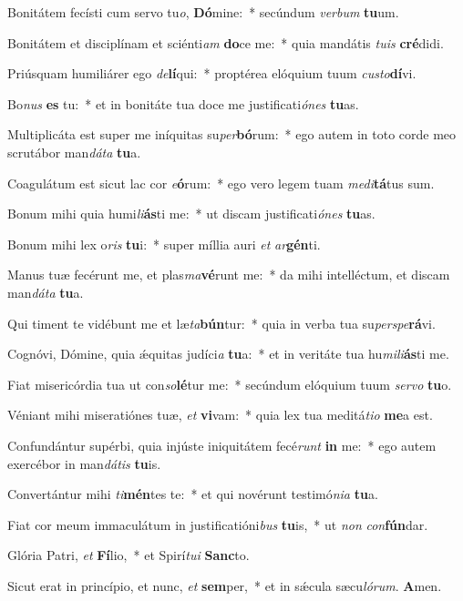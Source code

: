﻿\item Bonitátem fecísti cum servo tu\emph{o}, \textbf{Dó}mine:~* secúndum \emph{ver}\emph{bum} \textbf{tu}um.
\item Bonitátem et disciplínam et sciénti\emph{am} \textbf{do}ce me:~* quia mandátis \emph{tu}\emph{is} \textbf{cré}didi.
\item Priúsquam humiliárer ego \emph{de}\textbf{lí}qui:~* proptérea elóquium tuum \emph{cus}\emph{to}\textbf{dí}vi.
\item Bo\emph{nus} \textbf{es} tu:~* et in bonitáte tua doce me justificati\emph{ó}\emph{nes} \textbf{tu}as.
\item Multiplicáta est super me iníquitas su\emph{per}\textbf{bó}rum:~* ego autem in toto corde meo scrutábor man\emph{dá}\emph{ta} \textbf{tu}a.
\item Coagulátum est sicut lac cor \emph{e}\textbf{ó}rum:~* ego vero legem tuam \emph{me}\emph{di}\textbf{tá}tus sum.
\item Bonum mihi quia humi\emph{li}\textbf{ás}ti me:~* ut discam justificati\emph{ó}\emph{nes} \textbf{tu}as.
\item Bonum mihi lex o\emph{ris} \textbf{tu}i:~* super míllia auri \emph{et} \emph{ar}\textbf{gén}ti.
\item Manus tuæ fecérunt me, et plas\emph{ma}\textbf{vé}runt me:~* da mihi intelléctum, et discam man\emph{dá}\emph{ta} \textbf{tu}a.
\item Qui timent te vidébunt me et læ\emph{ta}\textbf{bún}tur:~* quia in verba tua su\emph{per}\emph{spe}\textbf{rá}vi.
\item Cognóvi, Dómine, quia ǽquitas judíci\emph{a} \textbf{tu}a:~* et in veritáte tua hu\emph{mi}\emph{li}\textbf{ás}ti me.
\item Fiat misericórdia tua ut con\emph{so}\textbf{lé}tur me:~* secúndum elóquium tuum \emph{ser}\emph{vo} \textbf{tu}o.
\item Véniant mihi miseratiónes tuæ, \emph{et} \textbf{vi}vam:~* quia lex tua meditá\emph{ti}\emph{o} \textbf{me}a est.
\item Confundántur supérbi, quia injúste iniquitátem fecé\emph{runt} \textbf{in} me:~* ego autem exercébor in man\emph{dá}\emph{tis} \textbf{tu}is.
\item Convertántur mihi \emph{ti}\textbf{mén}tes te:~* et qui novérunt testimó\emph{ni}\emph{a} \textbf{tu}a.
\item Fiat cor meum immaculátum in justificatióni\emph{bus} \textbf{tu}is,~* ut \emph{non} \emph{con}\textbf{fún}dar.
\item Glória Patri, \emph{et} \textbf{Fí}lio,~* et Spirí\emph{tu}\emph{i} \textbf{Sanc}to.
\item Sicut erat in princípio, et nunc, \emph{et} \textbf{sem}per,~* et in sǽcula sæcu\emph{ló}\emph{rum}. \textbf{A}men.